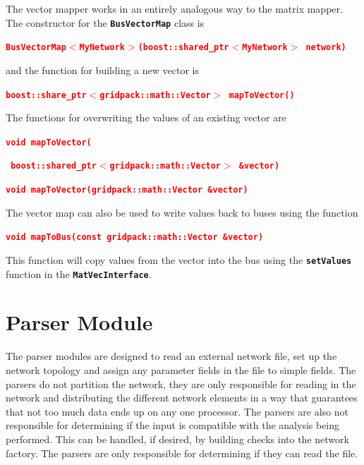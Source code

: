 \documentclass[12pt]{report} %
\begin{document}
The vector mapper works in an entirely analogous way to the matrix mapper. The constructor for the \texttt{\textbf{BusVectorMap}} class is

\textcolor{red}{\texttt{\textbf{BusVectorMap$\boldsymbol{\mathrm{<}}$MyNetwork$\boldsymbol{\mathrm{>}}$(boost::shared\_ptr$\boldsymbol{\mathrm{<}}$MyNetwork$\boldsymbol{\mathrm{>}}$ network)}}}

and the function for building a new vector is

\textcolor{red}{\texttt{\textbf{boost::share\_ptr$\boldsymbol{\mathrm{<}}$gridpack::math::Vector$\boldsymbol{\mathrm{>}}$ mapToVector()}}}

The functions for overwriting the values of an existing vector are

\textcolor{red}{\texttt{\textbf{void mapToVector(}}}

\textcolor{red}{\texttt{\textbf{    boost::shared\_ptr$\boldsymbol{\mathrm{<}}$gridpack::math::Vector$\boldsymbol{\mathrm{>}}$ \&vector)}}}


\textcolor{red}{\texttt{\textbf{void mapToVector(gridpack::math::Vector \&vector)}}}

The vector map can also be used to write values back to buses using the function

\textcolor{red}{\texttt{\textbf{void mapToBus(const gridpack::math::Vector \&vector)}}}

This function will copy values from the vector into the bus using the \texttt{\textbf{setValues}} function in the \texttt{\textbf{MatVecInterface}}.

\section{Parser Module}

The parser modules are designed to read an external network file, set up the network topology and assign any parameter fields in the file to simple fields. The parsers do not partition the network, they are only responsible for reading in the network and distributing the different network elements in a way that guarantees that not too much data ends up on any one processor. The parsers are also not responsible for determining if the input is compatible with the analysis being performed. This can be handled, if desired, by building checks into the network factory. The parsers are only responsible for determining if they can read the file.
\end{document}
